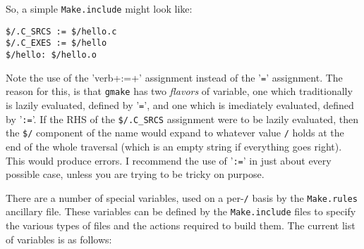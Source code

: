 \documentclass{article}
\begin{document}
So, a simple \verb+Make.include+ might look like:
\begin{verbatim}
$/.C_SRCS := $/hello.c
$/.C_EXES := $/hello
$/hello: $/hello.o
\end{verbatim}

Note the use of the 'verb+:=+' assignment instead of the '\verb+=+'
assignment.  The reason for this, is that \verb+gmake+ has two {\em flavors}
of variable, one which traditionally is lazily evaluated, defined by
'\verb+=+', and one which is imediately evaluated, defined by '\verb+:=+'.
If the RHS of the \verb+$/.C_SRCS+ assignment were to be lazily
evaluated, then the \verb+$/+ component of the name would expand to
whatever value \verb+/+ holds at the end of the whole traversal
(which is an empty string if everything goes right).  This would
produce errors.  I recommend the use of '\verb+:=+' in just about
every possible case, unless you are trying to be tricky on purpose.

There are a number of special variables, used on a per-\verb+/+
basis by the \verb+Make.rules+ ancillary file.  These variables can
be defined by the \verb+Make.include+ files to specify the various
types of files and the actions required to build them.  The current
list of variables is as follows:
\end{document}

